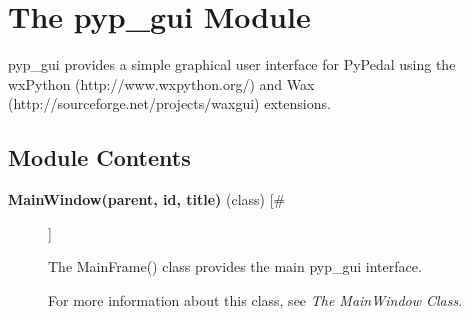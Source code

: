 \documentclass{article}
\begin{document}
\section*{The pyp\_gui Module}
\par pyp\_gui provides a simple graphical user interface for PyPedal using the wxPython
(http://www.wxpython.org/) and Wax (http://sourceforge.net/projects/waxgui) extensions.
\subsection*{Module Contents}
\begin{description}
\item[\textbf{MainWindow(parent, id, title)} (class) [\#]
]
\par The MainFrame() class provides the main pyp\_gui interface.
\par For more information about this class, see \textit{The MainWindow Class}.

\end{description}
\end{document}
